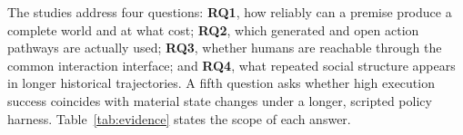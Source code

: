 The studies address four questions: \textbf{RQ1}, how reliably can a premise
produce a complete world and at what cost; \textbf{RQ2}, which generated and
open action pathways are actually used; \textbf{RQ3}, whether humans are
reachable through the common interaction interface; and \textbf{RQ4}, what
repeated social structure appears in longer historical trajectories.
A fifth question asks whether high execution success coincides with material
state changes under a longer, scripted policy harness.
Table~\ref{tab:evidence} states the scope of each answer.
